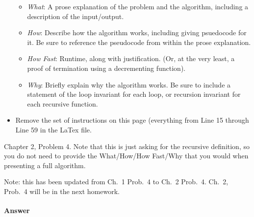 \documentclass{article}
\begin{document}
\begin{itemize}
        \begin{itemize}
            \item \emph{What}: A prose explanation of the problem and the algorithm,
                including a description of the input/output.
            \item \emph{How}: Describe how the algorithm works, including giving
                psuedocode for it.  Be sure to reference the pseudocode
                from within the prose explanation.
            \item \emph{How Fast}: Runtime, along with justification.  (Or, at
                the very least, a proof of termination using a decrementing function).
            \item \emph{Why}: Briefly explain why the algorithm works.  Be sure
                to include a statement of the loop invariant for each loop, or
                recursion invariant for each recursive function.
        \end{itemize}
    \item Remove the set of instructions on this page (everything from Line 15
        through Line 59 in the LaTex file.
\end{itemize}

\collab{\todo{}}

Chapter 2, Problem 4.  Note that this is just asking for the recursive
definition, so you do not need to provide the What/How/How Fast/Why that you
would when presenting a full algorithm.

Note: this has been updated from Ch.~1 Prob.~4 to Ch.~2 Prob.~4.  Ch.~2,
Prob.~4 will be in the next homework.

\paragraph{Answer}
\todo{}
\end{document}
